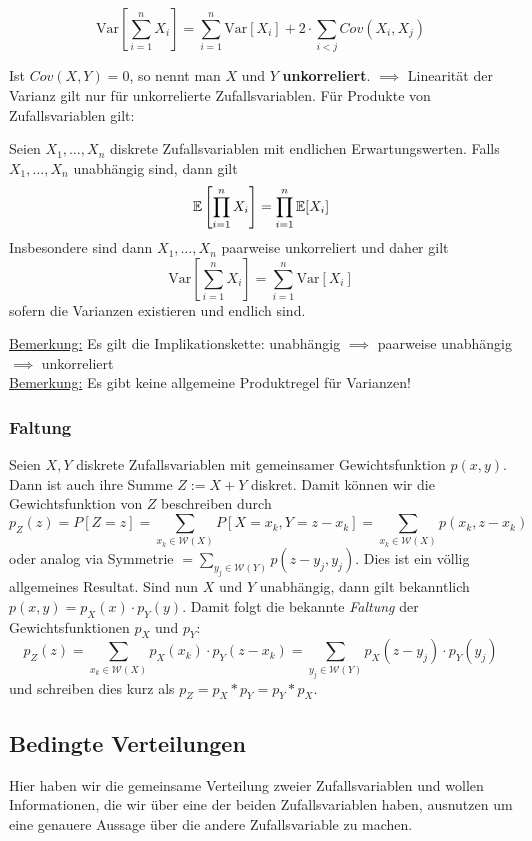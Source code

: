 \begin{korollar}
$$ \mbox{Var}\left[\sum_{i=1}^n X_i \right] = \sum_{i=1}^n \mbox{Var}[X_i] + 2 \cdot \sum_{i < j} Cov(X_i, X_j)$$
\end{korollar}
Ist $Cov(X,Y) = 0$, so nennt man $X$ und $Y$ \textbf{unkorreliert}. $\implies$ Linearität der Varianz gilt nur für unkorrelierte Zufallsvariablen. Für Produkte von Zufallsvariablen gilt:

\begin{satz}
Seien $X_1,\dots, X_n$  diskrete Zufallsvariablen mit endlichen Erwartungswerten. Falls $X_1,\dots,X_n$ unabhängig sind, dann gilt
$$\mathbb{E}\left[\prod_{i=1}^n X_i\right] = \prod_{i=1}^n \mathbb{E}[X_i]$$ Insbesondere sind dann $X_1,\dots,X_n$ paarweise unkorreliert und daher gilt
$$ \mbox{Var}\left[\sum_{i=1}^n X_i\right] = \sum_{i=1}^n \mbox{Var}[X_i]$$ sofern die Varianzen existieren und endlich sind.
\end{satz}
\underline{Bemerkung:} Es gilt die Implikationskette: unabhängig $\implies$ paarweise unabhängig $\implies$ unkorreliert\\

\underline{Bemerkung:} Es gibt keine allgemeine Produktregel für Varianzen!

\subsubsection*{Faltung}
Seien $X,Y$ diskrete Zufallsvariablen mit gemeinsamer Gewichtsfunktion $p(x,y)$. Dann ist auch ihre Summe $Z:=X+Y$ diskret. Damit können wir die Gewichtsfunktion von $Z$ beschreiben durch
$$ p_Z(z) = P[Z=z] = \sum_{x_k \in \mathcal{W}(X)} P[X=x_k, Y = z-x_k] = \sum_{x_k \in \mathcal{W}(X)} p(x_k, z-x_k)$$ oder analog via Symmetrie $= \sum_{y_j\in\mathcal{W}(Y)} p(z-y_j, y_j)$. Dies ist ein völlig allgemeines Resultat. Sind nun $X$ und $Y$ unabhängig, dann gilt bekanntlich $p(x,y)= p_X(x) \cdot p_Y(y)$. Damit folgt die bekannte \textit{Faltung} der Gewichtsfunktionen $p_X$ und $p_Y$:
$$ p_Z(z) = \sum_{x_k \in \mathcal{W}(X)} p_X(x_k) \cdot p_Y(z-x_k) = \sum_{y_j \in \mathcal{W}(Y)} p_X(z-y_j) \cdot p_Y(y_j)$$ und schreiben dies kurz als $p_Z = p_X * p_Y = p_Y * p_X$.

\subsection{Bedingte Verteilungen}
Hier haben wir die gemeinsame Verteilung zweier Zufallsvariablen und wollen Informationen, die wir über eine der beiden Zufallsvariablen haben, ausnutzen um eine genauere Aussage über die andere Zufallsvariable zu machen.

